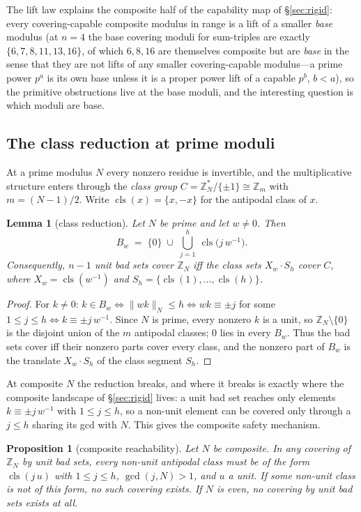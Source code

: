 \documentclass[11pt,a4paper]{article}
\numberwithin{equation}{section}
\theoremstyle{plain}
\theoremstyle{plain}
\newtheorem{lemma}[theorem]{Lemma}
\newtheorem{proposition}[theorem]{Proposition}
\theoremstyle{definition}
\theoremstyle{remark}
\newcommand{\Z}{\mathbb{Z}}
\newcommand{\wn}[1]{\lVert #1 \rVert_{N}}
\DeclareMathOperator{\cls}{cls}
\begin{document}
The lift law explains the composite half of the capability map of
\S\ref{sec:rigid}: every covering-capable composite modulus in range is a
lift of a smaller \emph{base} modulus (at $n=4$ the base covering moduli
for sum-triples are exactly $\{6,7,8,11,13,16\}$, of which $6,8,16$ are
themselves composite but are \emph{base} in the sense that they are not
lifts of any smaller covering-capable modulus---a prime power $p^a$ is its
own base unless it is a proper power lift of a capable $p^b$, $b<a$), so
the primitive obstructions live at the base moduli, and the interesting
question is which moduli are base.

\subsection{The class reduction at prime moduli}

At a prime modulus $N$ every nonzero residue is invertible, and the
multiplicative structure enters through the \emph{class group}
$C=\Z_N^\ast/\{\pm1\}\cong\Z_m$ with $m=(N-1)/2$. Write
$\cls(x)=\{x,-x\}$ for the antipodal class of $x$.

\begin{lemma}[class reduction]\label{lem:class}
Let $N$ be prime and let $w\ne 0$. Then
\[
B_w\;=\;\{0\}\;\cup\;\bigcup_{j=1}^{h}\ \cls\!\bigl(j\,w^{-1}\bigr).
\]
Consequently, $n-1$ unit bad sets cover $\Z_N$ iff the class sets
$X_w\cdot S_h$ cover $C$, where $X_w=\cls(w^{-1})$ and
$S_h=\{\cls(1),\dots,\cls(h)\}$.
\end{lemma}

\begin{proof}
For $k\ne 0$: $k\in B_w\iff \wn{wk}\le h\iff wk\equiv \pm j$ for some
$1\le j\le h\iff k\equiv \pm j\,w^{-1}$. Since $N$ is prime, every nonzero
$k$ is a unit, so $\Z_N\setminus\{0\}$ is the disjoint union of the $m$
antipodal classes; $0$ lies in every $B_w$. Thus the bad sets cover iff
their nonzero parts cover every class, and the nonzero part of $B_w$ is
the translate $X_w\cdot S_h$ of the class segment $S_h$.
\end{proof}

At composite $N$ the reduction breaks, and where it breaks is exactly
where the composite landscape of \S\ref{sec:rigid} lives: a unit bad set
reaches only elements $k\equiv\pm j\,w^{-1}$ with $1\le j\le h$, so a
non-unit element can be covered only through a $j\le h$ sharing its gcd
with $N$. This gives the composite safety mechanism.

\begin{proposition}[composite reachability]\label{prop:reach}
Let $N$ be composite. In any covering of $\Z_N$ by unit bad sets, every
non-unit antipodal class must be of the form $\cls(j\,u)$ with
$1\le j\le h$, $\gcd(j,N)>1$, and $u$ a unit. If some non-unit class is
not of this form, no such covering exists. If $N$ is even, no covering by
unit bad sets exists at all.
\end{proposition}
\end{document}

